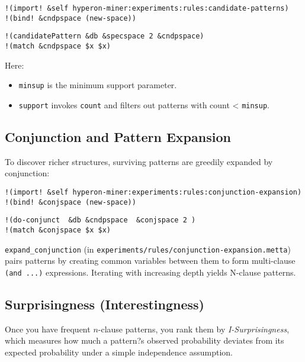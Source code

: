 \documentclass{article}
\begin{document}
 \begin{verbatim}
!(import! &self hyperon-miner:experiments:rules:candidate-patterns)
!(bind! &cndpspace (new-space))
  \end{verbatim}

\begin{verbatim}
!(candidatePattern &db &specspace 2 &cndpspace)
!(match &cndpspace $x $x)
\end{verbatim}

Here:\\

\begin{itemize}
  \item \texttt{minsup} is the minimum support parameter.
  \item \texttt{support} invokes \texttt{count} and filters out patterns with count < \texttt{minsup}.
\end{itemize}

\subsection{Conjunction and Pattern Expansion}

To discover richer structures, surviving patterns are greedily expanded by conjunction:

 \begin{verbatim}
!(import! &self hyperon-miner:experiments:rules:conjunction-expansion)
!(bind! &conjspace (new-space))
  \end{verbatim}

\begin{verbatim}
!(do-conjunct  &db &cndpspace  &conjspace 2 )
!(match &conjspace $x $x)
\end{verbatim}

\texttt{expand_conjunction} (in \texttt{experiments/rules/conjunction-expansion.metta}) pairs patterns by creating common variables between them to form multi-clause \verb|(and ...)| expressions.  Iterating with increasing depth yields N-clause patterns.

\subsection{Surprisingness (Interestingness)}

Once you have frequent $n$-clause patterns, you rank them by \emph{I-Surprisingness}, which measures how much a pattern?s observed probability deviates from its expected probability under a simple independence assumption.  
\end{document}
